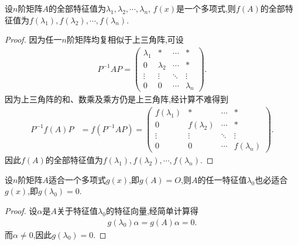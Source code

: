 \documentclass[lang=cn,newtx,10pt,scheme=chinese]{elegantbook}
\begin{document}
\begin{proposition}\label{proposition:矩阵多项式的特征值就是原特征值代入多项式得到的数}
设$n$阶矩阵$A$的全部特征值为$\lambda_1, \lambda_2, \cdots, \lambda_n$, $f(x)$是一个多项式,则$f(A)$的全部特征值为$f(\lambda_1), f(\lambda_2), \cdots, f(\lambda_n)$.
\end{proposition}
\begin{proof}
因为任一$n$阶矩阵均复相似于上三角阵,可设
\begin{align*}
P^{-1}AP = \begin{pmatrix}
\lambda_1 & * & \cdots & * \\
0 & \lambda_2 & \cdots & * \\
\vdots & \vdots & \ddots & \vdots \\
0 & 0 & \cdots & \lambda_n
\end{pmatrix}.
\end{align*}
因为上三角阵的和、数乘及乘方仍是上三角阵,经计算不难得到
\begin{align*}
P^{-1}f(A)P &= f(P^{-1}AP) = \begin{pmatrix}
f(\lambda_1) & * & \cdots & * \\
0 & f(\lambda_2) & \cdots & * \\
\vdots & \vdots & \ddots & \vdots \\
0 & 0 & \cdots & f(\lambda_n)
\end{pmatrix}.
\end{align*}
因此$f(A)$的全部特征值为$f(\lambda_1), f(\lambda_2), \cdots, f(\lambda_n)$.
\end{proof}

\begin{proposition}\label{proposition:矩阵适合的多项式其特征值也适合}
设$n$阶矩阵$A$适合一个多项式$g(x)$,即$g(A) = O$,则$A$的任一特征值$\lambda_0$也必适合$g(x)$,即$g(\lambda_0) = 0$.
\end{proposition}
\begin{proof}
设$\alpha$是$A$关于特征值$\lambda_0$的特征向量,经简单计算得
\begin{align*}
g(\lambda_0) \alpha = g(A) \alpha = 0.
\end{align*}
而$\alpha \neq 0$,因此$g(\lambda_0) = 0$.
\end{proof}
\end{document}
